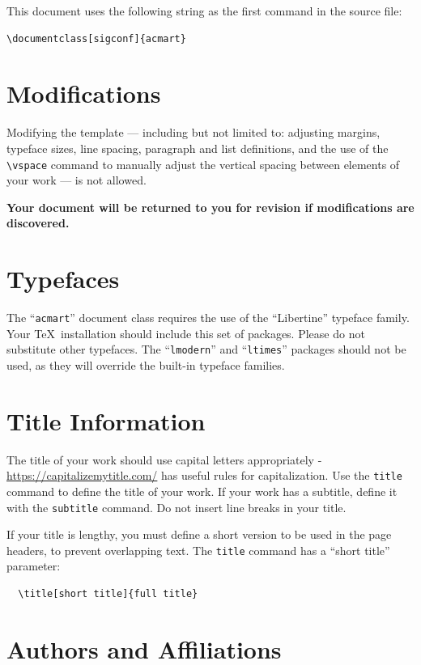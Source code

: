 \documentclass[sigconf]{acmart}
\begin{document}
This document uses the following string as the first command in the
source file:
\begin{verbatim}
\documentclass[sigconf]{acmart}
\end{verbatim}

\section{Modifications}

Modifying the template --- including but not limited to: adjusting
margins, typeface sizes, line spacing, paragraph and list definitions,
and the use of the \verb|\vspace| command to manually adjust the
vertical spacing between elements of your work --- is not allowed.

{\bfseries Your document will be returned to you for revision if
  modifications are discovered.}

\section{Typefaces}

The ``\verb|acmart|'' document class requires the use of the
``Libertine'' typeface family. Your \TeX\ installation should include
this set of packages. Please do not substitute other typefaces. The
``\verb|lmodern|'' and ``\verb|ltimes|'' packages should not be used,
as they will override the built-in typeface families.

\section{Title Information}

The title of your work should use capital letters appropriately -
\url{https://capitalizemytitle.com/} has useful rules for
capitalization. Use the {\verb|title|} command to define the title of
your work. If your work has a subtitle, define it with the
{\verb|subtitle|} command.  Do not insert line breaks in your title.

If your title is lengthy, you must define a short version to be used
in the page headers, to prevent overlapping text. The \verb|title|
command has a ``short title'' parameter:
\begin{verbatim}
  \title[short title]{full title}
\end{verbatim}

\section{Authors and Affiliations}
\end{document}
